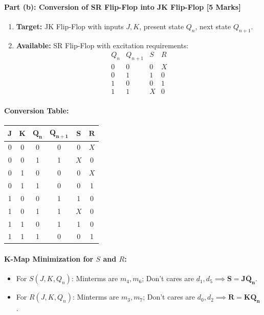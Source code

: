 \documentclass[11pt,a4paper,oneside]{book}
\begin{document}
\paragraph{Part (b): Conversion of SR Flip-Flop into JK Flip-Flop [5 Marks]}
\begin{enumerate}
  \item \textbf{Target:} JK Flip-Flop with inputs $J, K$, present state $Q_n$, next state $Q_{n+1}$.
  \item \textbf{Available:} SR Flip-Flop with excitation requirements:
  \[
  \begin{array}{cc|cc}
  Q_n & Q_{n+1} & S & R \\ \hline
  0 & 0 & 0 & X \\
  0 & 1 & 1 & 0 \\
  1 & 0 & 0 & 1 \\
  1 & 1 & X & 0
  \end{array}
  \]
\end{enumerate}

\paragraph{Conversion Table:}
\begin{center}
\begin{tabular}{|ccc||c||cc|}
\hline
$\mathbf{J}$ & $\mathbf{K}$ & $\mathbf{Q_n}$ & $\mathbf{Q_{n+1}}$ & $\mathbf{S}$ & $\mathbf{R}$ \\ \hline
0 & 0 & 0 & 0 & 0 & $X$ \\ \hline
0 & 0 & 1 & 1 & $X$ & 0 \\ \hline
0 & 1 & 0 & 0 & 0 & $X$ \\ \hline
0 & 1 & 1 & 0 & 0 & 1 \\ \hline
1 & 0 & 0 & 1 & 1 & 0 \\ \hline
1 & 0 & 1 & 1 & $X$ & 0 \\ \hline
1 & 1 & 0 & 1 & 1 & 0 \\ \hline
1 & 1 & 1 & 0 & 0 & 1 \\ \hline
\end{tabular}
\end{center}

\paragraph{K-Map Minimization for $S$ and $R$:}
\begin{itemize}
  \item For $S(J, K, Q_n)$: Minterms are $m_4, m_6$; Don't cares are $d_1, d_5 \implies \mathbf{S = J\bar{Q}_n}$.
  \item For $R(J, K, Q_n)$: Minterms are $m_3, m_7$; Don't cares are $d_0, d_2 \implies \mathbf{R = KQ_n}$.
\end{itemize}
\end{document}
